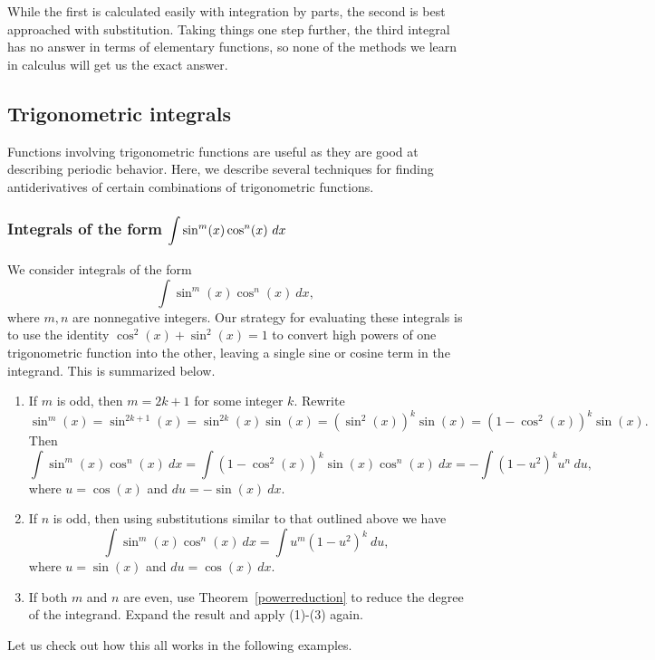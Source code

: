 While the first is calculated easily with integration by parts, the second is best approached with substitution.  Taking things one step further, the third integral has no answer in terms of elementary functions, so none of the methods we learn in calculus will get us the exact answer.

\subsection{Trigonometric integrals}\label{sec:trigint}
Functions involving trigonometric functions are useful as they are good at describing periodic behavior. %
Here, we describe several techniques for finding antiderivatives of certain combinations of trigonometric functions.

\subsubsection{Integrals of the form $\ds \int \sin^m (x)\cos^n (x)\ dx$}
We consider integrals of the form 
$$\int \sin^m(x)\cos^n(x)\ dx,$$ 
where $m,n$ are nonnegative integers. Our strategy for evaluating these integrals is to use the identity $\cos^2(x)+\sin^2(x)=1$ to convert high powers of one trigonometric function into the other, leaving a single sine or cosine term in the integrand. This is summarized below. 
\begin{enumerate}
	\item		If $m$ is odd, then $m=2k+1$ for some integer $k$. Rewrite 
			$$ \sin^m(x) = \sin^{2k+1}(x) = \sin^{2k}(x)\sin(x) = (\sin^2(x))^k\sin(x) = (1-\cos^2(x))^k\sin(x).$$
			Then 
			$$\int \sin^m(x)\cos^n(x)\ dx = \int (1-\cos^2(x))^k\sin(x)\cos^n(x)\ dx = -\int (1-u^2)^ku^n\ du,$$
			where $u = \cos(x)$ and $du = -\sin(x)\ dx$. 
	\item		If $n$ is odd, then using substitutions similar to that outlined above we have
			$$ \int \sin^m(x)\cos^n(x)\ dx = \int u^m(1-u^2)^k\ du,$$ 
			where $u = \sin(x)$ and $du = \cos(x)\ dx$.
	\item		If both $m$ and $n$ are even, use Theorem~\ref{powerreduction} 	to reduce the degree of the integrand. Expand the result and apply (1)-(3) again.
	\end{enumerate}

Let us check out how this all works in the following examples.

